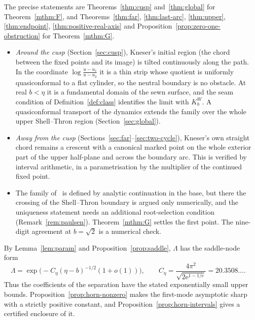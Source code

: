 \documentclass[11pt]{amsart}
\theoremstyle{definition}
\newcommand{\Kk}{K}
\newcommand{\eee}{\mathrm{e}}
\begin{document}
The precise statements are Theorems~\ref{thm:cusp} and~\ref{thm:global} for
Theorem~\ref{mthm:F}, and Theorems~\ref{thm:far}, \ref{thm:last-arc}, \ref{thm:upper},
\ref{thm:endpoint}, \ref{thm:positive-real-axis} and
Proposition~\ref{prop:zero-one-obstruction} for Theorem~\ref{mthm:G}.
\begin{itemize}
\item \emph{Around the cusp} (Section~\ref{sec:cusp}), Kneser's initial region (the chord
  between the fixed points and its image) is tilted continuously along the path.
  In the coordinate $\log\frac{u-u_1}{u-u_2}$ it is a thin strip whose quotient is uniformly
  quasiconformal to a flat cylinder, so the neutral boundary is no obstacle.  At
  real $b<\eta$ it is a fundamental domain of the sewn surface, and the seam
  condition of Definition~\ref{def:class} identifies the limit with $\Kk^W_b$.  A
  quasiconformal transport of the dynamics extends the family over the whole
  upper Shell--Thron region (Section~\ref{sec:global}).
\item \emph{Away from the cusp} (Sections~\ref{sec:far}--\ref{sec:two-cycle}), Kneser's own
  straight chord remains a crescent with a canonical marked point on the whole
  exterior part of the upper half-plane and across the boundary arc.  This is
  verified by interval arithmetic, in a parametrisation by the multiplier of
  the continued fixed point.
\item The family of~\cite{Paulsen2019} is defined by analytic continuation in the
  base, but there the crossing of the Shell--Thron boundary is argued only
  numerically, and the uniqueness statement needs an additional
  root-selection condition (Remark~\ref{rem:paulsen}).  Theorem~\ref{mthm:G} settles
  the first point.  The nine-digit agreement at $b=\sqrt2$ is a numerical check.
\end{itemize}
By Lemma~\ref{lem:param} and Proposition~\ref{prop:saddle}, $\Lambda$ has the
saddle-node form
\[
 \Lambda=\exp\bigl(-C_\eta(\eta-b)^{-1/2}(1+o(1))\bigr),\qquad
 C_\eta=\frac{4\pi^2}{\sqrt{2\eee^{1-1/\eee}}}=20.3508\ldots .
\]
Thus the coefficients of the separation have the stated exponentially
small upper bounds.  Proposition~\ref{prop:horn-nonzero} makes the
first-mode asymptotic sharp with a strictly positive constant, and
Proposition~\ref{prop:horn-intervals} gives a certified enclosure of it.
\end{document}
